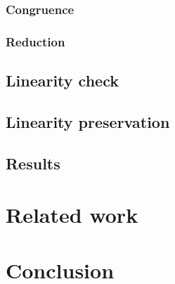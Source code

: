 \documentclass{mproj}
\begin{document}
\subsection{Congruence}
\subsection{Reduction}

\section{Linearity check}\label{linearity-check}

\section{Linearity preservation}\label{linearity-preservation}

\section{Results}\label{results}

\chapter{Related work}\label{related-work}

\chapter{Conclusion}\label{conclusion}



\end{document}
